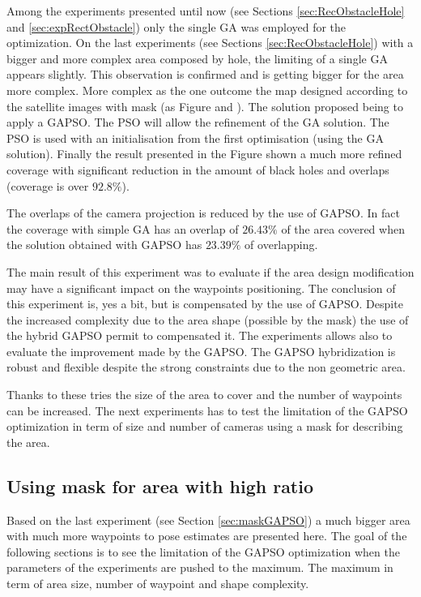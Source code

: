    Among the experiments presented until now (see Sections \ref{sec:RecObstacleHole} and \ref{sec:expRectObstacle}) only the single GA was employed for the optimization. On the last experiments (see Sections \ref{sec:RecObstacleHole}) with a bigger and more complex area composed by hole, the limiting of a single GA appears slightly. This observation is confirmed and is getting bigger for the area more complex. More complex as the one outcome the map designed according to the satellite images with mask (as Figure  and ).
The solution proposed being to apply a GAPSO. The PSO will allow the refinement of the GA solution.
The PSO is used with an initialisation from the first optimisation (using the GA solution). 
Finally the result presented in the Figure  shown a much more refined coverage with significant reduction in the amount of black holes and overlaps (coverage is over $92.8\%$). 

The overlaps of the camera projection is reduced by the use of GAPSO. In fact the coverage with simple GA has an overlap of $26.43\%$  of the area covered  when the  solution obtained with  GAPSO has $23.39\%$ of overlapping.

The main result of this experiment was to evaluate if the area design modification may have a significant impact on the waypoints positioning.
 The conclusion of this experiment is, yes a bit,  but is compensated by the use of GAPSO. Despite the increased complexity due to the area shape (possible by the mask) the use of the hybrid GAPSO permit to compensated it. The experiments allows also to evaluate the improvement made by the GAPSO. The GAPSO hybridization is robust and flexible despite the strong constraints due to the non geometric area.  

Thanks to these tries the size of the area to cover and the number of waypoints can be increased. The next experiments has to test the limitation of the GAPSO optimization in term of size and number of cameras using a mask for describing the area.


	\subsection{Using mask for area with high ratio}
	Based on the last experiment (see Section \ref{sec:maskGAPSO}) a much bigger area with much more waypoints to pose estimates are presented here. The goal of the following sections is to see the limitation of the GAPSO optimization when the parameters of the experiments are pushed to the maximum. The maximum in term of area size, number of waypoint and shape complexity.
	
